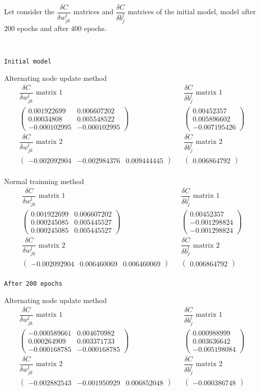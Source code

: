 \documentclass[12pt,english,]{article}
\newcommand{\mtx}[1]{\begin{pmatrix}#1\end{pmatrix}} %
\newcommand{\code}[1]{\colorbox{light-gray}{\texttt{#1}}}
\begin{document}
Let consider the $\dfrac{\delta C}{\delta w_{jk}^{l}}$ matrices and $\dfrac{\delta C}{\delta b_{j}^{l}}$ matrices of the initial model, model after $200$ epochs and after $400$ epochs.

~

\code{Initial model}

Alternating node update method
\begin{align*}
\text{$\dfrac{\delta C}{\delta w_{jk}^{l}}$ matrix 1} &&\text{$\dfrac{\delta C}{\delta b_{j}^{l}}$ matrix 1}\\
\mtx{0.001922699 & 0.006607202\\  0.00034808 & 0.005548522 \\ -0.000102995 & -0.000102995} &&\mtx{0.00452357 \\ 0.005896602 \\ -0.007195426 }\\
\text{$\dfrac{\delta C}{\delta w_{jk}^{l}}$ matrix 2} &&\text{$\dfrac{\delta C}{\delta b_{j}^{l}}$ matrix 2}\\
\mtx{-0.002092904 & -0.002984376 &  0.009444445} &&\mtx{0.006864792}\\
\end{align*}

Normal trainning method
\begin{align*}
\text{$\dfrac{\delta C}{\delta w_{jk}^{l}}$ matrix 1} &&\text{$\dfrac{\delta C}{\delta b_{j}^{l}}$ matrix 1}\\
\mtx{0.001922699 & 0.006607202\\  0.000245085 & 0.005445527 \\ 0.000245085 & 0.005445527} &&\mtx{0.00452357 \\ -0.001298824 \\ -0.001298824 }\\
\text{$\dfrac{\delta C}{\delta w_{jk}^{l}}$ matrix 2} &&\text{$\dfrac{\delta C}{\delta b_{j}^{l}}$ matrix 2}\\
\mtx{-0.002092904 & 0.006460069 &  0.006460069} &&\mtx{0.006864792}\\
\end{align*}

\code{After 200 epochs}

Alternating node update method
\begin{align*}
\text{$\dfrac{\delta C}{\delta w_{jk}^{l}}$ matrix 1} &&\text{$\dfrac{\delta C}{\delta b_{j}^{l}}$ matrix 1}\\
\mtx{-0.000589661 & 0.004670982\\  0.000264909 & 0.003371733 \\ -0.000168785 & -0.000168785} &&\mtx{0.000988999 \\ 0.003636642 \\ -0.005198084 }\\
\text{$\dfrac{\delta C}{\delta w_{jk}^{l}}$ matrix 2} &&\text{$\dfrac{\delta C}{\delta b_{j}^{l}}$ matrix 2}\\
\mtx{-0.002882543 & -0.001950929 &  0.006852048} &&\mtx{-0.000386748}\\
\end{align*}
\end{document}
